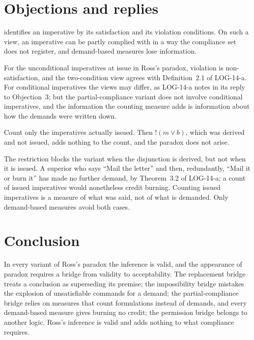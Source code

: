 \documentclass{situationist-preprint}
\begin{document}
\section{Objections and replies}

\begin{objection}
\citet{Vranas2008} identifies an imperative by its satisfaction and its violation conditions. On such a view, an imperative can be partly complied with in a way the compliance set does not register, and demand-based measures lose information.
\end{objection}

\begin{reply}
For the unconditional imperatives at issue in Ross's paradox, violation is non-satisfaction, and the two-condition view agrees with Definition~2.1 of LOG-14-a. For conditional imperatives the views may differ, as LOG-14-a notes in its reply to Objection~3; but the partial-compliance variant does not involve conditional imperatives, and the information the counting measure adds is information about how the demands were written down.
\end{reply}

\begin{objection}
Count only the imperatives actually issued. Then $!(m \vee b)$, which was derived and not issued, adds nothing to the count, and the paradox does not arise.
\end{objection}

\begin{reply}
The restriction blocks the variant when the disjunction is derived, but not when it is issued. A superior who says \enquote{Mail the letter} and then, redundantly, \enquote{Mail it or burn it} has made no further demand, by Theorem~3.2 of LOG-14-a; a count of issued imperatives would nonetheless credit burning. Counting issued imperatives is a measure of what was said, not of what is demanded. Only demand-based measures avoid both cases.
\end{reply}

\section{Conclusion}

In every variant of Ross's paradox the inference is valid, and the appearance of paradox requires a bridge from validity to acceptability. The replacement bridge treats a conclusion as superseding its premise; the impossibility bridge mistakes the explosion of unsatisfiable commands for a demand; the partial-compliance bridge relies on measures that count formulations instead of demands, and every demand-based measure gives burning no credit; the permission bridge belongs to another logic. Ross's inference is valid and adds nothing to what compliance requires.
\end{document}
